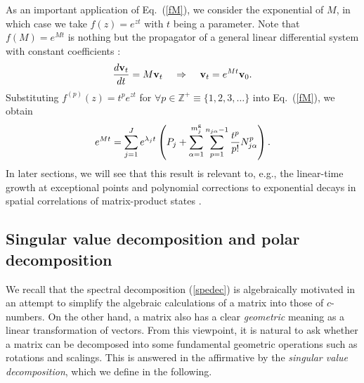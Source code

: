 \documentclass{tADP2e}
\theoremstyle{plain}
\theoremstyle{plain}
\theoremstyle{definition}
\begin{document}
As an important application of Eq.~(\ref{fM}), we consider the exponential of $M$, in which case we take $f(z)=e^{zt}$ with $t$ being a parameter. Note that $f(M)=e^{Mt}$ is nothing but the propagator of a general linear differential system with constant coefficients \cite{EAC55}: 
\begin{equation}
\frac{d\bold{v}_t}{dt}=M\bold{v}_t\;\;\;\;\Rightarrow\;\;\;\;
\bold{v}_t=e^{Mt}\bold{v}_0.
\end{equation}
Substituting $f^{(p)}(z)=t^pe^{zt}$ for $\forall p\in\mathbb{Z}^+\equiv\{1,2,3,\ldots\}$ into Eq.~(\ref{fM}), we obtain
\begin{equation}\label{jorlinear}
e^{Mt}=\sum^J_{j=1}e^{\lambda_jt}\left(P_j+\sum^{m^{\rm g}_j}_{\alpha=1}\sum^{n_{j\alpha}-1}_{p=1}\frac{t^p}{p!}N_{j\alpha}^p\right).
\end{equation}
In later sections, we will see that this result is relevant to, e.g., the linear-time growth at exceptional points \cite{Heiss2010}  and polynomial corrections to exponential decays in spatial correlations of matrix-product states \cite{FV08}.


\subsection{Singular value decomposition and polar decomposition\label{secsvd}}
We recall that the spectral decomposition (\ref{spedec}) is algebraically motivated in an attempt to simplify the algebraic calculations of a matrix into those of $c$-numbers. On the other hand, a matrix also has a clear \emph{geometric} meaning as a linear transformation of vectors. From this viewpoint, it is natural to ask whether a matrix can be decomposed into some fundamental geometric operations such as rotations and scalings. This is answered in the affirmative by the \emph{singular value decomposition}, which we define in the following.
\end{document}
